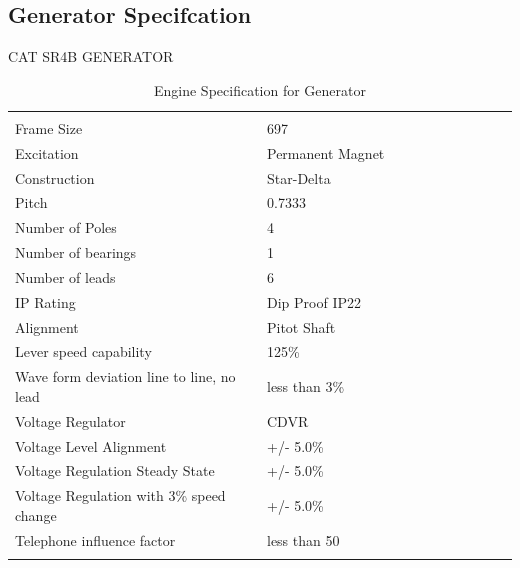\documentclass[12pt]{article}
\begin{document}
      \subsection*{Generator Specifcation}
      CAT SR4B GENERATOR \\
      \begin{table}[ht]
        \centering
        \begin{adjustbox}{width=\textwidth}
        \begin{tabularx}{\linewidth}{p{0.5\linewidth} p{0.5\linewidth}}
          \hline 
          \\
          Frame Size & 697 \\
          Excitation & Permanent Magnet \\
          Construction & Star-Delta \\
          Pitch & 0.7333 \\
          Number of Poles & 4 \\
          Number of bearings & 1 \\
          Number of leads & 6 \\
          IP Rating & Dip Proof IP22 \\
          Alignment & Pitot Shaft \\
          Lever speed capability & 125\%\\
          Wave form deviation line to line, no lead & less than 3\% \\
          Voltage Regulator & CDVR \\
          Voltage Level Alignment & +/- 5.0\% \\ 
          Voltage Regulation Steady State & +/- 5.0\% \\ 
          Voltage Regulation with 3\% speed change & +/- 5.0\% \\ 
          Telephone influence factor & less than 50 \\ 
          \\
          \hline
        \end{tabularx}
        \end{adjustbox}
        \caption{Engine Specification for Generator}
        
        \end{table}

  \vspace*{0.3cm}
\end{document}
